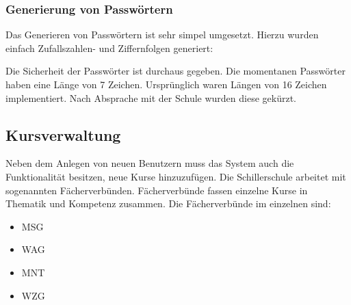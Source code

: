 	


\subsubsection{Generierung von Passwörtern}

Das Generieren von Passwörtern ist sehr simpel umgesetzt. Hierzu wurden einfach Zufallszahlen- und Ziffernfolgen generiert:

	
	
Die Sicherheit der Passwörter ist durchaus gegeben.
Die momentanen Passwörter haben eine Länge von 7 Zeichen. Ursprünglich waren Längen von 16 Zeichen implementiert. Nach Absprache mit der Schule wurden diese gekürzt.

\subsection{Kursverwaltung}

Neben dem Anlegen von neuen Benutzern muss das System auch die Funktionalität besitzen, neue Kurse hinzuzufügen.
Die Schillerschule arbeitet mit sogenannten Fächerverbünden. Fächerverbünde fassen einzelne Kurse in Thematik und Kompetenz zusammen.
Die Fächerverbünde im einzelnen sind:

\begin{itemize}
  \item \ac{MSG}

  \item \ac{WAG}
  
  \item \ac{MNT}
  
  \item \ac{WZG}
\end{itemize}

